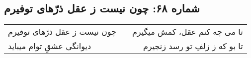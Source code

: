 \begin{center}
\section*{شماره ۶۸: چون نیست ز عقل ذرّهای توفیرم}
\label{sec:068}
\begin{longtable}{l p{0.5cm} r}
چون نیست ز عقل ذرّهای توفیرم
&&
تا می چه کنم عقل، کمش میگیرم
\\
دیوانگی عشقِ توام میباید
&&
تا بو که ز زلفِ تو رسد زنجیرم
\\
\end{longtable}
\end{center}
